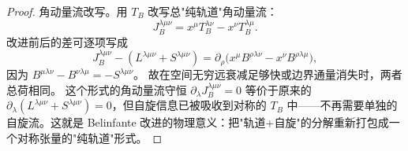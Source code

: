 \begin{proof}
角动量流改写。用 $T_B$ 改写总"纯轨道"角动量流：
\begin{equation*}
J_B^{\lambda\mu\nu}=x^\mu T_B^{\lambda\nu}-x^\nu T_B^{\lambda\mu}.
\end{equation*}
改进前后的差可逐项写成
\[
J_B^{\lambda\mu\nu}-(L^{\lambda\mu\nu}+S^{\lambda\mu\nu})
=\partial_\rho\bigl(x^\mu B^{\rho\lambda\nu}-x^\nu B^{\rho\lambda\mu}\bigr),
\]
因为 $B^{\mu\lambda\nu}-B^{\nu\lambda\mu}=-S^{\lambda\mu\nu}$。
故在空间无穷远衰减足够快或边界通量消失时，两者总荷相同。
这个形式的角动量流守恒 $\partial_\lambda J_B^{\lambda\mu\nu}=0$ 等价于原来的 $\partial_\lambda(L^{\lambda\mu\nu}+S^{\lambda\mu\nu})=0$，但自旋信息已被吸收到对称的 $T_B$ 中——不再需要单独的自旋流。这就是 Belinfante 改进的物理意义：把"轨道+自旋"的分解重新打包成一个对称张量的"纯轨道"形式。
\end{proof}
